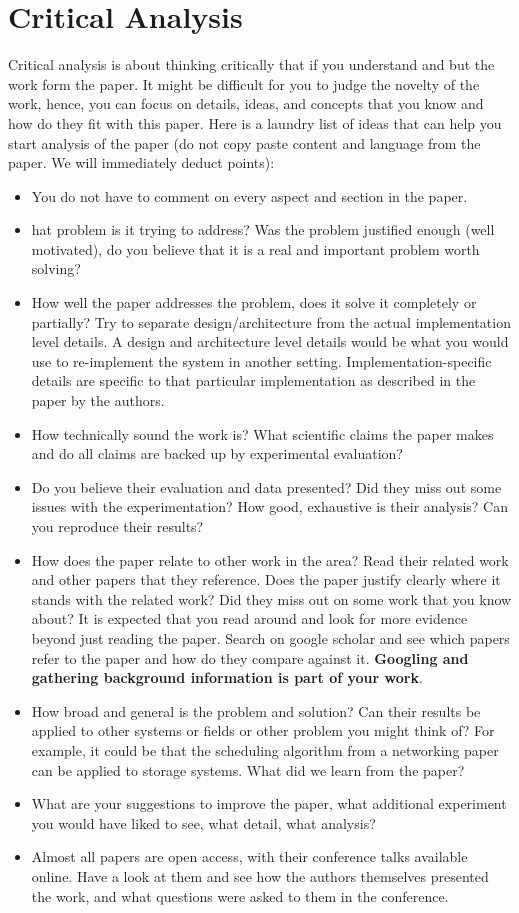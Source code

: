 \documentclass[sigconf,10pt, screen]{acmart}
\begin{document}
\section{Critical Analysis}
Critical analysis is about thinking critically that if you understand and but the work form the paper. It might be difficult for you to judge the novelty of the work, hence, you can focus on details, ideas, and concepts that you know and how do they fit with this paper. Here is a laundry list of ideas that can help you start analysis of the paper (do not copy paste content and language from the paper. We will immediately deduct points): 
\begin{itemize}
    \item You do not have to comment on every aspect and section in the paper. 
    \item hat problem is it trying to address? Was the problem justified enough (well motivated), do you believe that it is a real and important problem worth solving? 
    \item How well the paper addresses the problem, does it solve it completely or partially? Try to separate design/architecture from the actual implementation level details. A design and architecture level details would be what you would use to re-implement the system in another setting. Implementation-specific details are specific to that particular implementation as described in the paper by the authors. 
    \item How technically sound the work is? What scientific claims the paper makes and do all claims are backed up by experimental evaluation? 
    \item Do you believe their evaluation and data presented? Did they miss out some issues with the experimentation? How good, exhaustive is their analysis? Can you reproduce their results? 
    \item How does the paper relate to other work in the area? Read their related work and other papers that they reference. Does the paper justify clearly where it stands with the related work? Did they miss out on some work that you know about? It is expected that you read around and look for more evidence beyond just reading the paper. Search on google scholar and see which papers refer to the paper and how do they compare against it. \textbf{Googling and gathering background information is part of your work}.
    \item How broad and general is the problem and solution? Can their results be applied to other systems or fields or other problem you might think of? For example, it could be that the scheduling algorithm from a networking paper can be applied to storage systems. What did we learn from the paper? 
    \item What are your suggestions to improve the paper, what additional experiment you would have liked to see, what detail, what analysis? 
    \item Almost all papers are open access, with their conference talks available online. Have a look at them and see how the authors themselves presented the work, and what questions were asked to them in the conference. 
\end{itemize}
\end{document}

